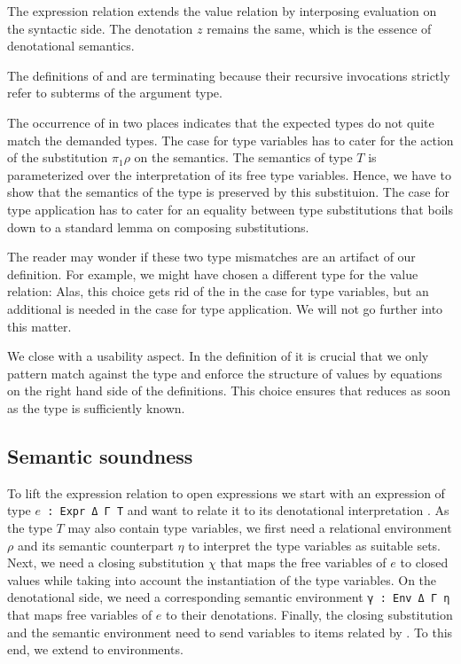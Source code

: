 \documentclass[acmsmall,anonymous,review,screen]{acmart}
\begin{document}
The expression relation extends the value relation by interposing
evaluation on the syntactic side. The denotation $z$ remains the
same, which is the essence of denotational semantics. 
\LogicalMCE

The definitions of {\AVSem} and {\AESem} are terminating because their
recursive invocations strictly refer to subterms of the argument type.

The occurrence of {\Asubst} in two places indicates that the expected types do not quite
match the demanded types.
The case for type variables has to cater for the action of the
substitution $\pi_1\rho$ on the semantics. The semantics of type $T$
is parameterized over the interpretation of its free type
variables. Hence, we have to show that the semantics of the type is
preserved by this substituion.
\TFsubstVarPreservesType
The case for type application has to cater for an equality between
type substitutions that boils down to a standard lemma on composing
substitutions.
\LogicallemmaOne

The reader may wonder if these two type mismatches are an
artifact of our definition. For example, we might have chosen a
different type for the value relation:
\LogicalVariationMCVType
Alas, this choice gets rid of the {\Asubst} in the case for type
variables, but an additional {\Asubst} is needed in the case for type
application. We will not go further into this matter.
\LogicalVariationMCVBodyUniversal

We close with a usability aspect.
In the definition of {\AVSem} it is crucial that we only pattern match
against the type and enforce the structure of values by equations on
the right hand side of the definitions. This choice ensures that {\AVSem}
reduces as soon as the type is sufficiently known.

\subsection{Semantic soundness}
\label{sec:relat-open-expr}

To lift the expression relation {\AESem} to open expressions we start
with an expression of type \texttt{$e$ : Expr Δ Γ T} and want to relate it
to its denotational interpretation . As the type $T$
may also contain type variables, we first need a relational
environment $\rho$ and its semantic counterpart $\eta$ to interpret
the type variables as suitable sets.
Next, we need a closing substitution $\chi$ that maps the free
variables of $e$ to closed values while taking into account the
instantiation of the type variables. On the denotational side, we need
a corresponding semantic environment \texttt{γ : Env Δ Γ η} that maps
free variables of $e$ to their denotations. Finally, the closing
substitution and the semantic environment need to send variables to
items related by {\AVSem}. To this end, we extend {\AVSem} to
environments.
\end{document}
